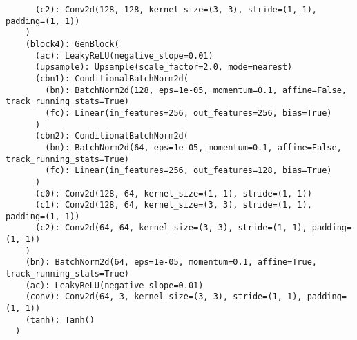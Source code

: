 \begin{lstlisting}
      (c2): Conv2d(128, 128, kernel_size=(3, 3), stride=(1, 1), padding=(1, 1))
    )
    (block4): GenBlock(
      (ac): LeakyReLU(negative_slope=0.01)
      (upsample): Upsample(scale_factor=2.0, mode=nearest)
      (cbn1): ConditionalBatchNorm2d(
        (bn): BatchNorm2d(128, eps=1e-05, momentum=0.1, affine=False, track_running_stats=True)
        (fc): Linear(in_features=256, out_features=256, bias=True)
      )
      (cbn2): ConditionalBatchNorm2d(
        (bn): BatchNorm2d(64, eps=1e-05, momentum=0.1, affine=False, track_running_stats=True)
        (fc): Linear(in_features=256, out_features=128, bias=True)
      )
      (c0): Conv2d(128, 64, kernel_size=(1, 1), stride=(1, 1))
      (c1): Conv2d(128, 64, kernel_size=(3, 3), stride=(1, 1), padding=(1, 1))
      (c2): Conv2d(64, 64, kernel_size=(3, 3), stride=(1, 1), padding=(1, 1))
    )
    (bn): BatchNorm2d(64, eps=1e-05, momentum=0.1, affine=True, track_running_stats=True)
    (ac): LeakyReLU(negative_slope=0.01)
    (conv): Conv2d(64, 3, kernel_size=(3, 3), stride=(1, 1), padding=(1, 1))
    (tanh): Tanh()
  )
\end{lstlisting}

